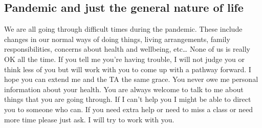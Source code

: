 \documentclass[
]{book}
\begin{document}
\hypertarget{pandemic-and-just-the-general-nature-of-life}{%
\subsection{Pandemic and just the general nature of life}\label{pandemic-and-just-the-general-nature-of-life}}

We are all going through difficult times during the pandemic. These include changes in our normal ways of doing things, living arrangements, family responsibilities, concerns about health and wellbeing, etc\ldots{} None of us is really OK all the time. If you tell me you're having trouble, I will not judge you or think less of you but will work with you to come up with a pathway forward. I hope you can extend me and the TA the same grace. You never owe me personal information about your health. You are always welcome to talk to me about things that you are going through. If I can't help you I might be able to direct you to someone who can. If you need extra help or need to miss a class or need more time please just ask. I will try to work with you.

  
\end{document}
